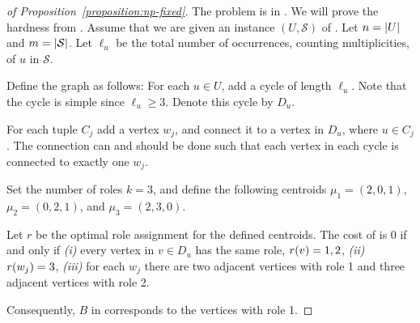 \begin{proof}[of Proposition~\ref{proposition:np-fixed}]
The problem is in \np.  We will prove the hardness from \tuples.
Assume that we are given an instance $(U, \mathcal{S})$ of \tuples.
Let $n = {\left|U\right|}$ and $m = {\left|\mathcal{S}\right|}$.
Let $\ell_u$ be the total number of occurrences, counting multiplicities,
of $u$ in $\mathcal{S}$.

Define the graph as follows:
For each $u \in U$, add a cycle of length $\ell_u$. Note that the cycle is simple
since $\ell_u \geq 3$. Denote this cycle by $D_u$.

For each tuple $C_j$ add a vertex $w_j$, and connect it to 
a vertex in $D_u$, where $u \in C_j$. The connection can and should be done such
that each vertex in each cycle is connected to exactly one $w_j$.

Set the number of roles $k = 3$, and define the following centroids $\mu_1 = (2, 0, 1)$, $\mu_2 = (0, 2, 1)$,
and $\mu_3 = (2, 3, 0)$.

Let $r$ be the optimal role assignment for the defined centroids.
The cost of is 0 if and only if
\emph{(i)} every vertex in $v \in D_u$ has the same role, $r(v) = 1, 2$,
\emph{(ii)} $r(w_j) = 3$,
\emph{(iii)} for each $w_j$ there are two adjacent vertices with role 1
and three adjacent vertices with role 2.

Consequently, $B$ in \tuples corresponds to the vertices with role 1.
\end{proof}
